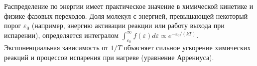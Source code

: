 \begin{remark}
Распределение по энергии имеет практическое значение в химической кинетике и физике фазовых переходов. Доля молекул с энергией, превышающей некоторый порог $\varepsilon_0$ (например, энергию активации реакции или работу выхода при испарении), определяется интегралом $\int_{\varepsilon_0}^\infty f(\varepsilon) d\varepsilon \propto e^{-\varepsilon_0/(kT)}$. Экспоненциальная зависимость от $1/T$ объясняет сильное ускорение химических реакций и процессов испарения при нагреве (уравнение Аррениуса).
\end{remark}
